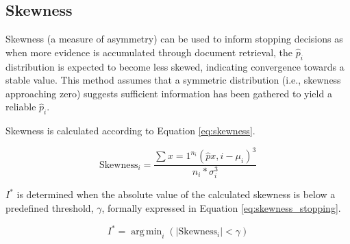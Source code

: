 \documentclass[sigconf,natbib=true,anonymous=true]{acmart}
\DeclareMathOperator*{\argmin}{arg\,min}
\begin{document}

\subsection{Skewness}
Skewness (a measure of asymmetry) can be used to inform stopping decisions as when more evidence is accumulated through document retrieval, the $\hat{p}_i$ distribution is expected to become less skewed, indicating convergence towards a stable value. This method assumes that a symmetric distribution (i.e., skewness approaching zero) suggests sufficient information has been gathered to yield a reliable $\hat{p}_i$.  

Skewness is calculated according to Equation \ref{eq:skewness}.

\begin{equation}
\label{eq:skewness}
\text{Skewness}_i = \frac{\sum{x=1}^{n_i} (\hat{p}{x,i} - \mu_i)^3}{n_i * \sigma_i^3}
\end{equation}

$I^*$ is determined when the absolute value of the calculated skewness is below a predefined threshold, $\gamma$, formally expressed in Equation \ref{eq:skewness_stopping}.

\begin{equation}
\label{eq:skewness_stopping}
I^* = \argmin_{i}  \left( |\text{Skewness}_i| < \gamma \right)
\end{equation}

\end{document}
